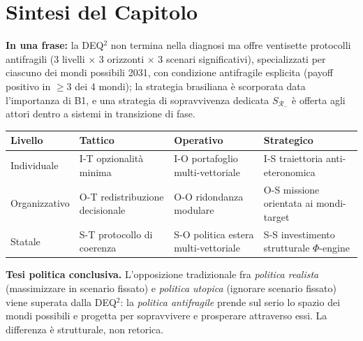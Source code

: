 \section{Sintesi del Capitolo}\label{sintesi-del-capitolo}

\Proved{} \textbf{In una frase:} la DEQ$^2$ non termina nella diagnosi ma
offre ventisette protocolli antifragili (3 livelli $\times$ 3 orizzonti $\times$ 3
scenari significativi), specializzati per ciascuno dei mondi possibili
2031, con condizione antifragile esplicita (payoff positivo in
\(\geq 3\) dei 4 mondi); la strategia brasiliana è scorporata data
l'importanza di B1, e una strategia di sopravvivenza dedicata
\(S_{\mathcal{R}_-}\) è offerta agli attori dentro a sistemi in
transizione di fase.

{\def\LTcaptype{none} %
{\small\begin{longtable}[]{@{}
  >{\raggedright\arraybackslash}p{}
  >{\raggedright\arraybackslash}p{}
  >{\raggedright\arraybackslash}p{}
  >{\raggedright\arraybackslash}p{}@{}}
\toprule\noalign{}
\begin{minipage}[b]{\linewidth}\raggedright
Livello
\end{minipage} & \begin{minipage}[b]{\linewidth}\raggedright
Tattico
\end{minipage} & \begin{minipage}[b]{\linewidth}\raggedright
Operativo
\end{minipage} & \begin{minipage}[b]{\linewidth}\raggedright
Strategico
\end{minipage} \\
\midrule\noalign{}
\endhead
\bottomrule\noalign{}
\endlastfoot
Individuale & I-T opzionalità minima & I-O portafoglio multi-vettoriale
& I-S traiettoria anti-eteronomica \\
Organizzativo & O-T redistribuzione decisionale & O-O ridondanza
modulare & O-S missione orientata ai mondi-target \\
Statale & S-T protocollo di coerenza & S-O politica estera
multi-vettoriale & S-S investimento strutturale \(\Phi\)-engine \\
\end{longtable}}
}

\Hypoth{} \textbf{Tesi politica conclusiva.} L'opposizione tradizionale
fra \emph{politica realista} (massimizzare in scenario fissato) e
\emph{politica utopica} (ignorare scenario fissato) viene superata dalla
DEQ$^2$: la \emph{politica antifragile} prende sul serio lo spazio dei
mondi possibili e progetta per sopravvivere e prosperare attraverso
essi. La differenza è strutturale, non retorica.



